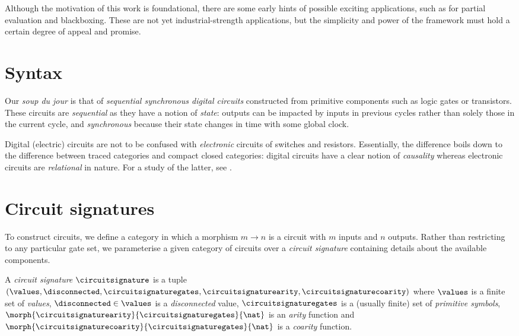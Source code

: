 \documentclass{lmcs}
\begin{document}
Although the motivation of this work is foundational, there are some early
hints of possible exciting applications, such as for partial evaluation and
blackboxing.
These are not yet industrial-strength applications, but the simplicity and
power of the framework must hold a certain degree of appeal and promise.

\section{Syntax}

Our \emph{soup du jour} is that of
\emph{sequential synchronous digital circuits}
constructed from primitive components such as logic gates or transistors.
These circuits are \emph{sequential} as they have a notion of \emph{state}:
outputs can be impacted by inputs in previous cycles rather than solely those in
the current cycle, and \emph{synchronous} because their state changes in time
with some global clock.

\begin{rem}
    Digital (electric) circuits are not to be confused with \emph{electronic}
    circuits of switches and resistors.
    Essentially, the difference boils down to the difference between traced
    categories and compact closed categories: digital circuits have a clear
    notion of \emph{causality} whereas electronic circuits are \emph{relational}
    in nature.
    For a study of the latter, see \cite{boisseau2022string}.
\end{rem}

\section{Circuit signatures}

To construct circuits, we define a category in which a morphism
\(m \to n\) is a circuit with \(m\) inputs and \(n\) outputs.
Rather than restricting to any particular gate set, we parameterise a given
category of circuits over a \emph{circuit signature} containing details about
the available components.

\begin{defi}
    A \emph{circuit signature} \(\circuitsignature\) is a tuple \((
    \values,
    \disconnected,
    \circuitsignaturegates,
    \circuitsignaturearity,
    \circuitsignaturecoarity
    )\) where \(\values\) is a finite set of \emph{values}, \(
    \disconnected \in \values
    \) is a \emph{disconnected} value, \(\circuitsignaturegates\) is a (usually
    finite) set of \emph{primitive symbols}, \(
    \morph{\circuitsignaturearity}{\circuitsignaturegates}{\nat}
    \) is an \emph{arity} function and \(
    \morph{\circuitsignaturecoarity}{\circuitsignaturegates}{\nat}
    \) is a \emph{coarity} function.
\end{defi}
\end{document}
